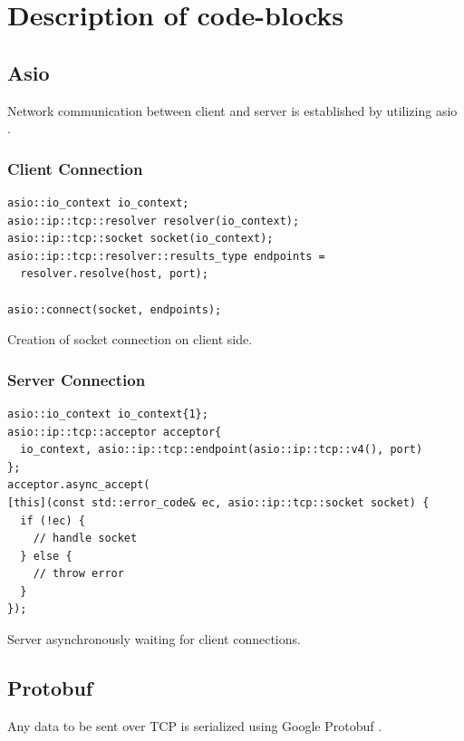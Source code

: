 \documentclass[12pt, letterpaper]{article}
\newenvironment{code}{\captionsetup{type=listing}}{}
\begin{document}
\section{Description of code-blocks}


\subsection{Asio}
Network communication between client and server is established by utilizing asio \cite{asio}.

\subsubsection{Client Connection}

\begin{code}
	\begin{verbatim}
asio::io_context io_context;
asio::ip::tcp::resolver resolver(io_context);
asio::ip::tcp::socket socket(io_context);
asio::ip::tcp::resolver::results_type endpoints = 
  resolver.resolve(host, port);

asio::connect(socket, endpoints);

	\end{verbatim}
	\caption{Creation of socket connection on client side.}
	\label{clientConnection}
\end{code}

\pagebreak

\subsubsection{Server Connection}

\begin{code}
	\begin{verbatim}
asio::io_context io_context{1};
asio::ip::tcp::acceptor acceptor{
  io_context, asio::ip::tcp::endpoint(asio::ip::tcp::v4(), port)
};
acceptor.async_accept(
[this](const std::error_code& ec, asio::ip::tcp::socket socket) {
  if (!ec) {
    // handle socket
  } else {
    // throw error
  }
});
	\end{verbatim}
	\caption{Server asynchronously waiting for client connections.}
	\label{serverConnection}
\end{code}

\subsection{Protobuf}
Any data to be sent over TCP is serialized using Google Protobuf \cite{protobuf}.
\end{document}

